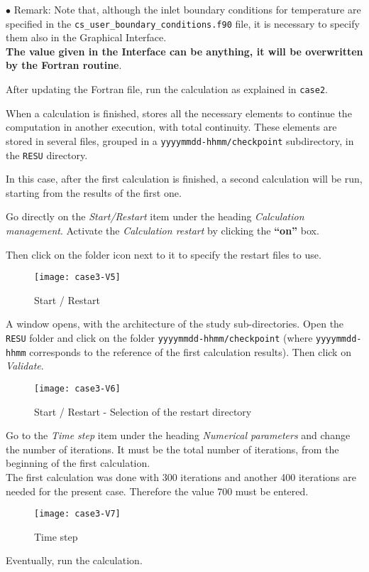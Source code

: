 $\bullet$ Remark: Note that, although the inlet boundary conditions for temperature are
specified in the \texttt{cs\_user\_boundary\_conditions.f90} file, it is necessary to
specify them also in the Graphical Interface.\\

\textbf{The value given in the Interface can be anything, it will be overwritten by the
Fortran routine}.

After updating the Fortran file, run the calculation as explained in
\texttt{case2}.

\newpage

When a calculation is finished, \CS stores all the necessary elements to
continue the computation in another execution, with total continuity. These
elements are stored in several files, grouped in
a \texttt{yyyymmdd-hhmm/checkpoint} subdirectory, in the \texttt{RESU} directory.

In this case, after the first calculation is finished, a second calculation will
be run, starting from the results of the first one.

Go directly on the {\itshape Start/Restart} item under the heading
{\itshape Calculation management}.  Activate the {\itshape Calculation restart}
by clicking the \textbf{``on''} box.

Then click on the folder icon next to it to specify the restart files to use.

\begin{figure}[h!]
\begin{center}
\texttt{[image: case3-V5]}
\caption{Start / Restart}
\label{fig4_e3}
\end{center}
\end{figure}


\newpage
A window opens, with the architecture of the study sub-directories. Open the
\texttt{RESU} folder and click on the folder \texttt{yyyymmdd-hhmm/checkpoint}
(where \texttt{yyyymmdd-hhmm} corresponds to the reference of the first calculation results).
Then click on {\itshape Validate}.

\begin{figure}[h!]
\begin{center}
\texttt{[image: case3-V6]}
\caption{Start / Restart - Selection of the restart directory}
\label{fig5_e3}
\end{center}
\end{figure}


\newpage
Go to the {\itshape Time step} item under the heading {\itshape Numerical parameters}
and change the number of iterations. It must be the total number of
iterations, from the beginning of the first calculation.\\

The first calculation was done with 300 iterations and another 400 iterations
are needed for the present case. Therefore the value 700 must be entered.

\begin{figure}[h!]
\begin{center}
\texttt{[image: case3-V7]}
\caption{Time step}
\label{fig6_e3}
\end{center}
\end{figure}

Eventually, run the calculation.

